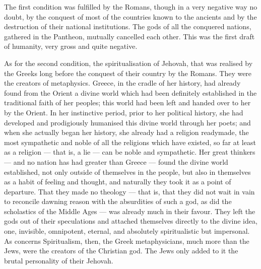 \documentclass[12pt]{report}
\begin{document}
The first condition was fulfilled by the Romans, though in a very negative way no doubt, by the conquest of most of the countries known to the ancients and by the destruction of their national institutions. The gods of all the conquered nations, gathered in the Pantheon, mutually cancelled each other. This was the first draft of humanity, very gross and quite negative.


As for the second condition, the spiritualisation of Jehovah, that was realised by the Greeks long before the conquest of their country by the Romans. They were the creators of metaphysics. Greece, in the cradle of her history, had already found from the Orient a divine world which had been definitely established in the traditional faith of her peoples; this world had been left and handed over to her by the Orient. In her instinctive period, prior to her political history, she had developed and prodigiously humanised this divine world through her poets; and when she actually began her history, she already had a religion readymade, the most sympathetic and noble of all the religions which have existed, so far at least as a religion — that is, a lie — can be noble and sympathetic. Her great thinkers — and no nation has had greater than Greece — found the divine world established, not only outside of themselves in the people, but also in themselves as a habit of feeling and thought, and naturally they took it as a point of departure. That they made no theology — that is, that they did not wait in vain to reconcile dawning reason with the absurdities of such a god, as did the scholastics of the Middle Ages — was already much in their favour. They left the gods out of their speculations and attached themselves directly to the divine idea, one, invisible, omnipotent, eternal, and absolutely spiritualistic but impersonal. As concerns Spiritualism, then, the Greek metaphysicians, much more than the Jews, were the creators of the Christian god. The Jews only added to it the brutal personality of their Jehovah.
\end{document}
